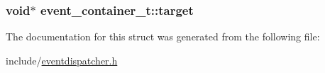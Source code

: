 \subsubsection[{\texorpdfstring{target}{target}}]{\setlength{\rightskip}{0pt plus 5cm}void$\ast$ event\+\_\+container\+\_\+t\+::target}\hypertarget{structevent__container__t_a30d9aecb000fe0e8b061b970ad1def64}{}\label{structevent__container__t_a30d9aecb000fe0e8b061b970ad1def64}


The documentation for this struct was generated from the following file\+:\begin{DoxyCompactItemize}
\item 
include/\hyperlink{eventdispatcher_8h}{eventdispatcher.\+h}\end{DoxyCompactItemize}
